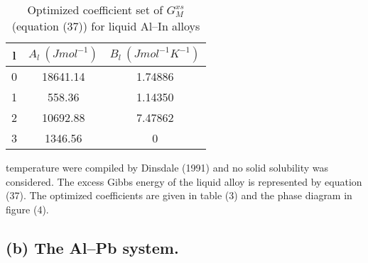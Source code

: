 \documentclass[12pt]{article}
\newcommand*{\1}{\hspace{1pt}}
\begin{document}
\begin{adjustbox}{center,caption={calculated phase diagram 
    (continuous curve) using the coefficient set given in 
    table 2.
    },label={somelabel},nofloat=figure,vspace=\bigskipamount}
\end{adjustbox}
\begin{table}[t!]
    \centering
    \caption{Optimized coefficient set of $G ^ {xs} _ {M}$ 
    (equation (37)) for liquid Al–In alloys}
     \begin{tabular}{|c c c|} 
     \hline
     l & $A_l \ (J mol^{-1})$ & $B_l \ (J mol^{-1}K^{-1})$ \\ [0.5ex] 
     \hline\hline
     0 & 18641.14 & 1.74886  \\ 
     1 & 558.36 & 1.14350  \\
     2 & 10692.88 & 7.47862  \\
     3 & 1346.56 & 0 \\ [1ex] 
     \hline
     \end{tabular}
    \end{table}
\begin{adjustbox}{center,caption={Calculated enthalpy of mixing 
    (continuous curve) using the coefficient set given in
    table 2.},label={somelabel},nofloat=figure,vspace=\bigskipamount}
\end{adjustbox}

temperature were compiled by Dinsdale (1991) and no solid 
solubility was considered. The excess Gibbs energy of the 
liquid alloy is represented by equation (37). The optimized 
coefficients are given in table (3) and the phase diagram in 
figure (4).\\



\subsection*{(b) The Al–Pb system.}
\end{document}

